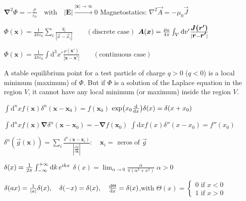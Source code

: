 
\begin{squishlist}
\item $\boldsymbol{\nabla}^2\Phi = -\frac{\rho}{\varepsilon_0} \quad \text{with} \quad |\boldsymbol{E}| \overset{|\boldsymbol{x}|\to \infty}{\longrightarrow} 0$ \hfill \squishsep Magnetostatics: $\nabla^2 \vec{A} = - \mu_0 \vec{J}$

\item $\Phi(\boldsymbol{x}) = \frac{1}{4\pi \varepsilon_0} \sum_{i} \frac{q_i}{|\vec{x}-\vec{x}_i|} \qquad (\text{discrete case})$
\hfill \squishsep $\mbox{\boldmath$A$}(\mbox{\boldmath$x$}) = \frac{\mu_0}{4 \pi} \int_{V}\textrm{d} v' \frac{\mbox{\boldmath$J(\mbox{\boldmath$r'$})$}}{|\mbox{\boldmath$r$} - \mbox{\boldmath$r'$}|}$

\item $\Phi(\boldsymbol{x}) = \frac{1}{4\pi \varepsilon_0} \int \text{d}^3x' \frac{\rho(\boldsymbol{x}')}{|\boldsymbol{x}-\boldsymbol{x}'|} \qquad (\text{continuous case})$

\item A stable equilibrium point for a test particle of charge $q>0$ ($q<0$) is a local minimum (maximum) of $\Phi$.
But if $\Phi$ is a solution of the Laplace equation
in the region $V$, it cannot have any local minimum (or
maximum) inside the region $V$.
\end{squishlist}

\begin{squishlist}
\item $\int \text{d}^nx f(\boldsymbol{x})\delta^n(\boldsymbol{x}-\boldsymbol{x}_0)= f(\boldsymbol{x}_0)$ \squishsep $\exp(x_0 \frac{\textrm{d} }{\textrm{d} x})\delta(x) = \delta(x+x_0)$

\item $\int \text{d}^nx f(\boldsymbol{x})\boldsymbol{\nabla}\delta^n(\boldsymbol{x}-\boldsymbol{x}_0)= - \boldsymbol{\nabla}f(\boldsymbol{x}_0)$ \squishsep $\int \text{d}x f(x)\delta''(x-x_0)= f''(x_0)$

\item $\delta^n(\vec{g}(\boldsymbol{x})) = \sum_i \frac{\delta^n(\boldsymbol{x}-\boldsymbol{x}_i)}{\left|\frac{\partial \vec{g}}{\partial \boldsymbol{x}} \right|} : \quad \boldsymbol{x}_i = \text{ zeros of }\vec{g}$

\item $\delta(x) = \frac{1}{2\pi} \int_{-\infty}^{+\infty}\textrm{d} k \, e^{ikx}$ \squishsep $\delta(x) = \lim_{\alpha\rightarrow0}\frac{\alpha}{\pi(\alpha^2 + x^2)}\; \alpha>0$

\item $\delta(ax) = \frac{1}{|a|} \delta(x), \quad \delta(-x) = \delta(x), \quad \frac{\textrm{d} \Theta}{\textrm{d} x} = \delta(x)$,\quad with $\Theta(x)=\begin{cases}0 \text{ if } x<0\\1 \text{ if } x>0\end{cases}$
\end{squishlist}


